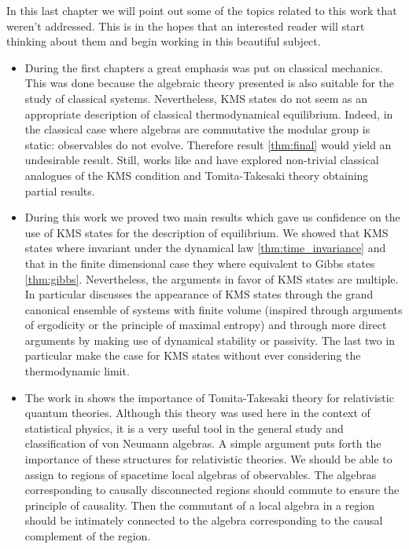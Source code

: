 In this last chapter we will point out some of the topics related to this work that weren't addressed. This is in the hopes that an interested reader will start thinking about them and begin working in this beautiful subject.

\begin{itemize}

\item During the first chapters a great emphasis was put on classical mechanics. This was done because the algebraic theory presented is also suitable for the study of classical systems. Nevertheless, KMS states do not seem as an appropriate description of classical thermodynamical equilibrium. Indeed, in the classical case where algebras are commutative the modular group is static: observables do not evolve. Therefore result \ref{thm:final} would yield an undesirable result. Still, works like \cite{Aizenman1977} and \cite{Gallavotti1976} have explored non-trivial classical analogues of the KMS condition and Tomita-Takesaki theory obtaining partial results.

\item During this work we proved two main results which gave us confidence on the use of KMS states for the description of equilibrium. We showed that KMS states where invariant under the dynamical law \ref{thm:time_invariance} and that in the finite dimensional case they where equivalent to Gibbs states \ref{thm:gibbs}. Nevertheless, the arguments in favor of KMS states are multiple. In particular \cite{Haag1992} discusses the appearance of KMS states through the grand canonical ensemble of systems with finite volume (inspired through arguments of ergodicity or the principle of maximal entropy) and through more direct arguments by making use of dynamical stability or passivity. The last two in particular make the case for KMS states without ever considering the thermodynamic limit.

\item The work in \cite{Haag1992} shows the importance of Tomita-Takesaki theory for relativistic quantum theories. Although this theory was used here in the context of statistical physics, it is a very useful tool in the general study and classification of von Neumann algebras. A simple argument puts forth the importance of these structures for relativistic theories. We should be able to assign to regions of spacetime local algebras of observables. The algebras corresponding to causally disconnected regions should commute to ensure the principle of causality. Then the commutant of a local algebra in a region should be intimately connected to the algebra corresponding to the causal complement of the region. 


\end{itemize}
